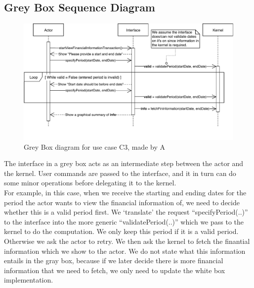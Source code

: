 \subsection*{Grey Box Sequence Diagram}
\begin{figure}[H]
	\centering
	\includegraphics[scale=.9]{uml/SD-gb-finInformation.pdf}
	\caption*{Grey Box diagram for use case C3, made by A}
\end{figure}
The interface in a grey box acts as an intermediate step between the actor and the kernel. User commands are passed to the interface, and it in turn can do some minor operations before delegating it to the kernel.\\For example, in this case, when we receive the starting and ending dates for the period the actor wants to view the financial information of, we need to decide whether this is a valid period first. We `translate' the request ``specifyPeriod(..)'' to the interface into the more generic ``validatePeriod(..)'' which we pass to the kernel to do the computation. We only keep this period if it is a valid period. Otherwise we ask the actor to retry. We then ask the kernel to fetch the finantial information which we show to the actor. We do not state what this information entails in the gray box, because if we later decide there is more financial information that we need to fetch, we only need to update the white box implementation.

